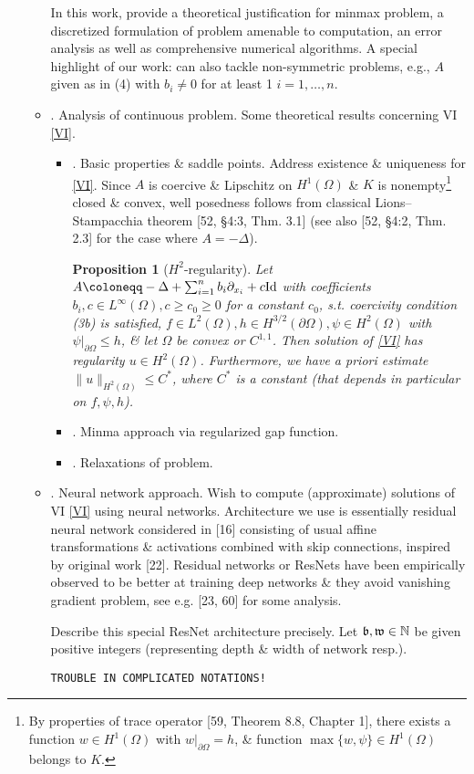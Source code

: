 \documentclass{article}
\newtheorem{proposition}{Proposition}
\begin{document}
\begin{enumerate}
\begin{itemize}
		In this work, provide a theoretical justification for minmax problem, a discretized formulation of problem amenable to computation, an error analysis as well as comprehensive numerical algorithms. A special highlight of our work: can also tackle non-symmetric problems, e.g., $A$ given as in (4) with $b_i\ne0$ for at least 1 $i = 1,\ldots,n$.
		
		\item {. Analysis of continuous problem.} Some theoretical results concerning VI \eqref{VI}.
		\begin{itemize}
			\item {. Basic properties \& saddle points.} Address existence \& uniqueness for \eqref{VI}. Since $A$ is coercive \& Lipschitz on $H^1(\Omega)$ \& $K$ is nonempty\footnote{By properties of trace operator [59, Theorem 8.8, Chapter 1], there exists a function $w\in H^1(\Omega)$ with $w|_{\partial\Omega} = h$, \& function $\max\{w,\psi\}\in H^1(\Omega)$ belongs to $K$.} closed \& convex, well posedness follows from classical Lions--Stampacchia theorem [52, \S4:3, Thm. 3.1] (see also [52, \S4:2, Thm. 2.3] for the case where $A = -\Delta$).
			
			\begin{proposition}[$H^2$-regularity]
				Let $A\coloneqq-\Delta + \sum_{i=1}^n b_i\partial_{x_i} + c{\rm Id}$ with coefficients $b_i,c\in L^\infty(\Omega),c\ge c_0\ge0$ for a constant $c_0$, s.t. coercivity condition (3b) is satisfied, $f\in L^2(\Omega),h\in H^{3/2}(\partial\Omega),\psi\in H^2(\Omega)$ with $\psi|_{\partial\Omega}\le h$, \& let $\Omega$ be convex or $C^{1,1}$. Then solution of \eqref{VI} has regularity $u\in H^2(\Omega)$. Furthermore, we have a priori estimate $\|u\|_{H^2(\Omega)}\le C^*$, where $C^*$ is a constant (that depends in particular on $f,\psi,h$).
			\end{proposition}
			\item {. Minma approach via regularized gap function.}
			\item {. Relaxations of problem.}
		\end{itemize}
		\item {. Neural network approach.} Wish to compute (approximate) solutions of VI \eqref{VI} using neural networks. Architecture we use is essentially residual neural network considered in [16] consisting of usual affine transformations \& activations combined with skip connections, inspired by original work [22]. Residual networks or ResNets have been empirically observed to be better at training deep networks \& they avoid vanishing gradient problem, see e.g. [23, 60] for some analysis.
		
		Describe this special ResNet architecture precisely. Let ${\frak b},{\frak w}\in\mathbb{N}$ be given positive integers (representing depth \& width of network resp.).
		
		{\tt TROUBLE IN COMPLICATED NOTATIONS!}
	\end{itemize}
\end{enumerate}
\end{document}
